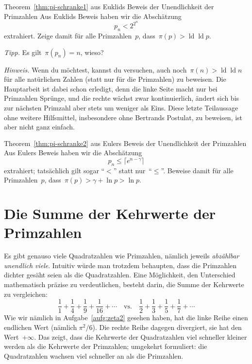 \documentclass[twoside]{../zirkelblatt1415}
\theoremstyle{definition}
\theoremstyle{plain}
\theoremstyle{remark}
\DeclareMathOperator{\ld}{ld}
\begin{document}
\begin{aufgabe}{Theorem~\ref{thm:pi-schranke1} aus Euklids Beweis der
Unendlichkeit der Primzahlen}
Aus Euklids Beweis haben wir die Abschätzung
\[ p_n < 2^{2^n} \]
extrahiert. Zeige damit für alle Primzahlen~$p$, dass~$\pi(p) > \ld \ld p$.

\emph{Tipp.} Es gilt~$\pi(p_n) = n$, wieso?

\emph{Hinweis.} Wenn du möchtest, kannst du versuchen, auch noch~$\pi(n) > \ld
\ld n$ für alle natürlichen Zahlen (statt nur für die Primzahlen) zu beweisen.
Die Hauptarbeit ist dabei schon erledigt, denn die linke Seite macht nur bei
Primzahlen Sprünge, und die rechte wächst zwar kontinuierlich, ändert sich bis
zur nächsten Primzahl aber stets um weniger als Eins. Diese letzte Teilaussage
ohne weitere Hilfsmittel, insbesondere ohne Bertrands Postulat, zu beweisen,
ist aber nicht ganz einfach.
\end{aufgabe}

\begin{aufgabe}{Theorem~\ref{thm:pi-schranke2} aus Eulers Beweis der
Unendlichkeit der Primzahlen}
Aus Eulers Beweis haben wir die Abschätzung
\[ p_n \leq \lceil e^{n-\gamma} \rceil \]
extrahiert; tatsächlich gilt sogar "`$<$"' statt nur~"`$\leq$"'. Beweise damit
für alle Primzahlen~$p$, dass~$\pi(p) > \gamma + \ln p > \ln p$.
\end{aufgabe}



\section{Die Summe der Kehrwerte der Primzahlen}

Es gibt genauso viele Quadratzahlen wie Primzahlen, nämlich jeweils
\emph{abzählbar unendlich viele}. Intuitiv würde man trotzdem behaupten, dass
die Primzahlen dichter gesäht seien als die Quadratzahlen. Eine Möglichkeit,
den Unterschied mathematisch präzise zu verdeutlichen, besteht darin, die Summe
der Kehrwerte zu vergleichen:
\[ \frac{1}{1} + \frac{1}{4} + \frac{1}{9} + \frac{1}{16} + \cdots
  \quad\text{vs.}\quad
  \frac{1}{2} + \frac{1}{3} + \frac{1}{5} + \frac{1}{7} + \cdots \]
Wie wir nämlich in Aufgabe~\ref{aufg:zeta2} gesehen haben, hat die linke Reihe
einen endlichen Wert (nämlich $\pi^2/6$). Die rechte Reihe dagegen divergiert, sie hat
den Wert~$+\infty$. Das zeigt, dass die Kehrwerte der Quadratzahlen viel schneller
kleiner werden als die Kehrwerte der Primzahlen; umgekehrt formuliert: die
Quadratzahlen wachsen viel schneller an als die Primzahlen.
\end{document}
